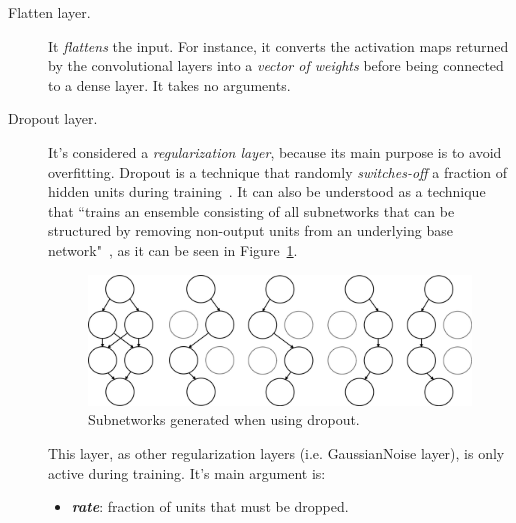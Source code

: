 \begin{description}
	\item[Flatten layer.] It \textit{flattens} the input. For instance, it converts the activation maps returned by the convolutional layers into a \emph{vector of weights} before being connected to a dense layer. It takes no arguments.
\end{description}

\begin{description}
	\item[Dropout layer.] It's considered a \emph{regularization layer}, because its main purpose is to avoid overfitting. Dropout is a technique that randomly \emph{\textit{switches-off}} a fraction of hidden units during training~\cite{srivastava2014dropout}. It can also be understood as a technique that ``trains an ensemble consisting of all subnetworks that can be structured by removing non-output units from an underlying base network"~\cite{Goodfellow-et-al-2016}, as it can be seen in Figure~\ref{fig:dropout}.

	\begin{figure}
		\centering
		\includegraphics[width=1\linewidth, keepaspectratio]{figures/dropout.png}
		\caption{Subnetworks generated when using dropout.}
		\label{fig:dropout}
	\end{figure}	

	 This layer, as other regularization layers (i.e. GaussianNoise layer), is only active during training. It's main argument is:
	\begin{itemize}
		\item \textbf{\textit{rate}}: fraction of units that must be dropped.
	\end{itemize}
	
\end{description}

